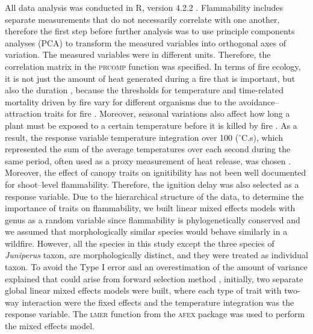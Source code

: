 \documentclass{bmcart}
\newcommand{\pkg}[1]{\textsc{#1}}
\begin{document}
All data analysis was conducted in R, version 4.2.2 \citep{R}. 
Flammability includes separate measurements that do not necessarily correlate with one another, therefore the first step before further analysis was to use principle components analyses (PCA) to transform the measured variables into orthogonal axes of variation. The measured variables were in different units. Therefore, the correlation matrix in the \pkg{prcomp} function was specified. In terms of fire ecology, it is not just the amount of heat generated during a fire that is important, but also the duration \citep{mcgranahan2020inconvenient}, because the thresholds for temperature and time-related mortality driven by fire vary for different organisms \citep{nelson1952observations,vines1968heat, bond1983dead, hengst1994bark,pinard1997fire,lawes2011bark, pingree2019myth} due to the avoidance–attraction traits for fire \citep{schwilk2001flammability, archibald2019unified}. Moreover, seasonal variations also affect how long a plant must be exposed to a certain temperature before it is killed by fire \citep{wright1970method}. As a result, the response variable temperature integration over 100 ($^{\circ}$C.s), which represented the sum of the average temperatures over each second during the same period, often used as a proxy measurement of heat release, was chosen \citep{gao2018grass, mcgranahan2020inconvenient}. Moreover, the effect of canopy traits on ignitibility has not been well documented for shoot--level flammability. Therefore, the ignition delay was also selected as a response variable. Due to the hierarchical structure of the data, to determine the importance of traits on flammability, we built linear mixed effects models with genus as a random variable since flammability is phylogenetically conserved \citep{cui2020shoot} and we assumed that morphologically similar species would behave similarly in a wildfire. However, all the species in this study except the three species of \emph{Juniperus} taxon,
are morphologically distinct, and they were treated as individual taxon. To avoid the  Type I error and an overestimation of the amount of variance explained that could arise from forward selection method \citep{blanchet2008forward}, initially, two separate global linear mixed effects models were built, where each type of trait with two-way interaction were the fixed effects and the temperature integration was the response variable. The \pkg{lmer} function from the \pkg{afex} package \citep{singmann2015packageafex,afexluke2017evaluating} was used to perform the mixed effects model. 
\end{document}
